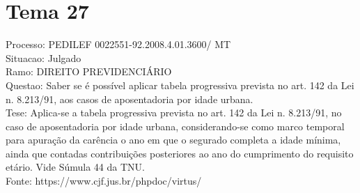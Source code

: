 \documentclass[12pt]{article}
\begin{document}
\section*{Tema 27}
Processo: PEDILEF 0022551-92.2008.4.01.3600/ MT\\
Situacao: Julgado\\
Ramo: DIREITO PREVIDENCIÁRIO\\
Questao: Saber se é possível aplicar tabela progressiva prevista no art. 142 da Lei n. 8.213/91, aos casos de aposentadoria por idade urbana.\\
Tese: Aplica-se a tabela progressiva prevista no art. 142 da Lei n. 8.213/91, no caso de aposentadoria por idade urbana, considerando-se como marco temporal para apuração da carência o ano em que o segurado completa a idade mínima, ainda que contadas contribuições posteriores ao ano do cumprimento do requisito etário. Vide Súmula 44 da TNU.\\
Fonte: https://www.cjf.jus.br/phpdoc/virtus/
\end{document}
